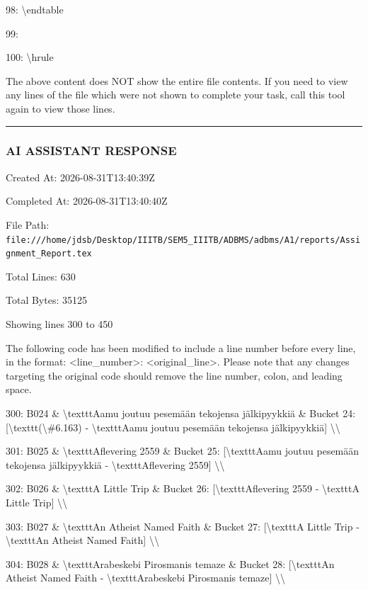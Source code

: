 \documentclass[11pt,a4paper]{article}
\begin{document}
{98: \textbackslash{}end{table}

99:

100: \textbackslash{}hrule

The above content does NOT show the entire file contents. If you need to view any lines of the file which were not shown to complete your task, call this tool again to view those lines.


\hrule

\subsubsection{AI ASSISTANT RESPONSE}

Created At: 2026-08-31T13:40:39Z

Completed At: 2026-08-31T13:40:40Z

File Path: \texttt{file:///home/jdsb/Desktop/IIITB/SEM5\_IIITB/ADBMS/adbms/A1/reports/Assignment\_Report.tex}

Total Lines: 630

Total Bytes: 35125

Showing lines 300 to 450

The following code has been modified to include a line number before every line, in the format: <line\_number>: <original\_line>. Please note that any changes targeting the original code should remove the line number, colon, and leading space.

300: B024 \& \textbackslash{}texttt{Aamu joutuu pesemään tekojensa jälkipyykkiä} \& Bucket 24: [\textbackslash{}texttt{(\textbackslash{}\#6.163)} - \textbackslash{}texttt{Aamu joutuu pesemään tekojensa jälkipyykkiä}] \textbackslash{}\textbackslash{}

301: B025 \& \textbackslash{}texttt{Aflevering 2559} \& Bucket 25: [\textbackslash{}texttt{Aamu joutuu pesemään tekojensa jälkipyykkiä} - \textbackslash{}texttt{Aflevering 2559}] \textbackslash{}\textbackslash{}

302: B026 \& \textbackslash{}texttt{A Little Trip} \& Bucket 26: [\textbackslash{}texttt{Aflevering 2559} - \textbackslash{}texttt{A Little Trip}] \textbackslash{}\textbackslash{}

303: B027 \& \textbackslash{}texttt{An Atheist Named Faith} \& Bucket 27: [\textbackslash{}texttt{A Little Trip} - \textbackslash{}texttt{An Atheist Named Faith}] \textbackslash{}\textbackslash{}

304: B028 \& \textbackslash{}texttt{Arabeskebi Pirosmanis temaze} \& Bucket 28: [\textbackslash{}texttt{An Atheist Named Faith} - \textbackslash{}texttt{Arabeskebi Pirosmanis temaze}] \textbackslash{}\textbackslash{}

}
\end{document}
